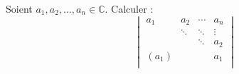 \documentclass[a4paper,10pt]{report}
\begin{document}
\begin{Exercice}{} Soient $a_1 ,a_2 , \ldots ,a_n \in \mathbb{C}$. Calculer :
    \[
    \begin{vmatrix}
        {a_1} & {a_2} & \cdots & {a_n} \\
        {} & \ddots & \ddots & \vdots \\
        {} & {} & \ddots & {a_2} \\
        {(a_1)} & {} & {} & {a_1} \\
    \end{vmatrix}
    \]
\end{Exercice}
\end{document}
